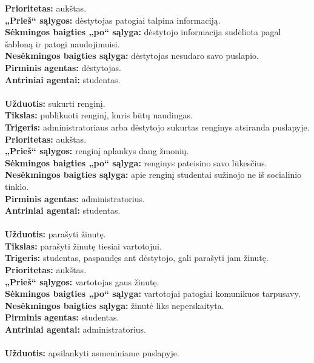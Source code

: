 \documentclass{VUMIFPSkursinis}
\begin{document}
\textbf{Prioritetas:} aukštas. \\
\textbf{„Prieš“ sąlygos:} dėstytojas patogiai talpina informaciją.\\
\textbf{Sėkmingos baigties „po“ sąlyga:} dėstytojo informacija sudėliota pagal šabloną ir patogi naudojimuisi. \\
\textbf{Nesėkmingos baigties sąlyga:} dėstytojas nesudaro savo puslapio. \\
\textbf{Pirminis agentas:} dėstytojas. \\
\textbf{Antriniai agentai:} studentas. \\
\\
\textbf{Užduotis:} sukurti renginį. \\
\textbf{Tikslas:} publikuoti renginį, kuris būtų naudingas.\\
\textbf{Trigeris:} administratoriaus arba dėstytojo sukurtas renginys atsiranda puslapyje. \\
\textbf{Prioritetas:} aukštas. \\
\textbf{„Prieš“ sąlygos:} renginį aplankys daug žmonių.\\
\textbf{Sėkmingos baigties „po“ sąlyga:} renginys pateisino savo lūkesčius. \\
\textbf{Nesėkmingos baigties sąlyga:} apie renginį studentai sužinojo ne iš socialinio tinklo. \\
\textbf{Pirminis agentas:} administratorius. \\
\textbf{Antriniai agentai:} studentas. \\
\\
\textbf{Užduotis:} parašyti žinutę. \\
\textbf{Tikslas:} parašyti žinutę tiesiai vartotojui.\\
\textbf{Trigeris:} studentas, paspaudęs ant dėstytojo, gali parašyti jam žinutę. \\
\textbf{Prioritetas:} aukštas. \\
\textbf{„Prieš“ sąlygos:} vartotojas gaus žinutę.\\
\textbf{Sėkmingos baigties „po“ sąlyga:} vartotojai patogiai komunikuos tarpusavy. \\
\textbf{Nesėkmingos baigties sąlyga:} žinutė liks neperskaityta. \\
\textbf{Pirminis agentas:} studentas. \\
\textbf{Antriniai agentai:} administratorius.\\
\\
\textbf{Užduotis:} apsilankyti asmeniniame puslapyje. \\
\end{document}
